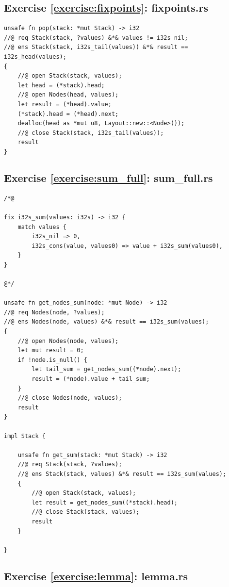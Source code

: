 \documentclass{article}
\begin{document}
\subsection{Exercise
\ref{exercise:fixpoints}: fixpoints.rs}\label{solution:fixpoints}

\begin{lstlisting}
unsafe fn pop(stack: *mut Stack) -> i32
//@ req Stack(stack, ?values) &*& values != i32s_nil;
//@ ens Stack(stack, i32s_tail(values)) &*& result == i32s_head(values);
{
    //@ open Stack(stack, values);
    let head = (*stack).head;
    //@ open Nodes(head, values);
    let result = (*head).value;
    (*stack).head = (*head).next;
    dealloc(head as *mut u8, Layout::new::<Node>());
    //@ close Stack(stack, i32s_tail(values));
    result
}
\end{lstlisting}

\subsection{Exercise
\ref{exercise:sum_full}: sum\_full.rs}\label{solution:sum_full}

\begin{lstlisting}
/*@

fix i32s_sum(values: i32s) -> i32 {
    match values {
        i32s_nil => 0,
        i32s_cons(value, values0) => value + i32s_sum(values0),
    }
}

@*/

unsafe fn get_nodes_sum(node: *mut Node) -> i32
//@ req Nodes(node, ?values);
//@ ens Nodes(node, values) &*& result == i32s_sum(values);
{
    //@ open Nodes(node, values);
    let mut result = 0;
    if !node.is_null() {
        let tail_sum = get_nodes_sum((*node).next);
        result = (*node).value + tail_sum;
    }
    //@ close Nodes(node, values);
    result
}

impl Stack {

    unsafe fn get_sum(stack: *mut Stack) -> i32
    //@ req Stack(stack, ?values);
    //@ ens Stack(stack, values) &*& result == i32s_sum(values);
    {
        //@ open Stack(stack, values);
        let result = get_nodes_sum((*stack).head);
        //@ close Stack(stack, values);
        result
    }

}
\end{lstlisting}

\subsection{Exercise
\ref{exercise:lemma}: lemma.rs}\label{solution:lemma}
\end{document}
